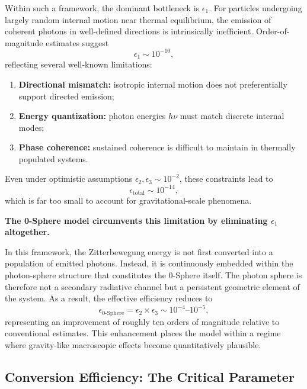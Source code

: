 \documentclass[12pt,letterpaper]{article}
\begin{document}
Within such a framework, the dominant bottleneck is $\epsilon_1$. For particles undergoing largely random internal motion near thermal equilibrium, the emission of coherent photons in well-defined directions is intrinsically inefficient. Order-of-magnitude estimates suggest
\[
\epsilon_1 \sim 10^{-10},
\]
reflecting several well-known limitations:
\begin{enumerate}
\item \textbf{Directional mismatch:} isotropic internal motion does not preferentially support directed emission;
\item \textbf{Energy quantization:} photon energies $h\nu$ must match discrete internal modes;
\item \textbf{Phase coherence:} sustained coherence is difficult to maintain in thermally populated systems.
\end{enumerate}

Even under optimistic assumptions $\epsilon_2, \epsilon_3 \sim 10^{-2}$, these constraints lead to
\[
\epsilon_\text{total} \sim 10^{-14},
\]
which is far too small to account for gravitational-scale phenomena.

\medskip
\noindent
\textbf{The 0-Sphere model circumvents this limitation by eliminating $\epsilon_1$ altogether.}

In this framework, the Zitterbewegung energy is not first converted into a population of emitted photons. Instead, it is continuously embedded within the photon-sphere structure that constitutes the 0-Sphere itself. The photon sphere is therefore not a secondary radiative channel but a persistent geometric element of the system. As a result, the effective efficiency reduces to
\begin{equation}
\epsilon_\text{0-Sphere} = \epsilon_2 \times \epsilon_3 \sim 10^{-4}\text{--}10^{-5},
\end{equation}
representing an improvement of roughly ten orders of magnitude relative to conventional estimates. This enhancement places the model within a regime where gravity-like macroscopic effects become quantitatively plausible.


\subsection{Conversion Efficiency: The Critical Parameter}
\label{subsec:conversion_efficiency}
\end{document}

